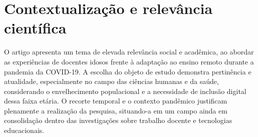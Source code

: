 \chapter{Contextualização e relevância científica}  \label{cap:intro} 

O artigo apresenta um tema de elevada relevância social e acadêmica, ao abordar as experiências de docentes idosos frente à adaptação ao ensino remoto durante a pandemia da COVID-19. A escolha do objeto de estudo demonstra pertinência e atualidade, especialmente no campo das ciências humanas e da saúde, considerando o envelhecimento populacional e a necessidade de inclusão digital dessa faixa etária. O recorte temporal e o contexto pandêmico justificam plenamente a realização da pesquisa, situando-a em um campo ainda em consolidação dentro das investigações sobre trabalho docente e tecnologias educacionais.